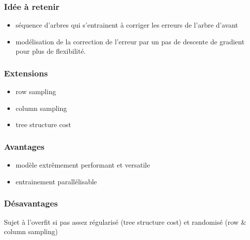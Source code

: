 \documentclass{formation}
\begin{document}
\begin{frame}
  \frametitle{Idée à retenir}

  \begin{itemize}
  \item séquence d'arbres qui s'entrainent à corriger les erreurs de
    l'arbre d'avant
  \item modélisation de la correction de l'erreur par un pas de
    descente de gradient pour plus de flexibilité.
  \end{itemize}
   
\end{frame}

\begin{frame}
  \frametitle{Extensions}

  \begin{itemize}
  \item row sampling
  \item column sampling
  \item tree structure cost
  \end{itemize}
\end{frame}

\begin{frame}
  \frametitle{Avantages}

  \begin{itemize}
  \item modèle extrêmement performant et versatile
  \item entrainement parallélisable
  \end{itemize}
\end{frame}

\begin{frame}
  \frametitle{Désavantages}

  Sujet à l'overfit si pas assez régularisé (tree structure cost) et
  randomisé (row \& column sampling)
\end{frame}
\end{document}
